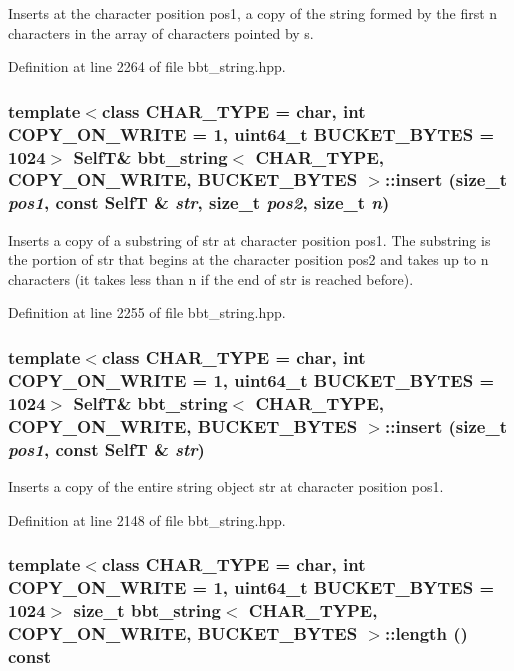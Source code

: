 Inserts at the character position pos1, a copy of the string formed by the first n characters in the array of characters pointed by s. 

Definition at line 2264 of file bbt\_\-string.hpp.\hypertarget{classbbt__string_fe7cd0b9d0f147a22424695cca30e463}{
\subsubsection[{insert}]{\setlength{\rightskip}{0pt plus 5cm}template$<$class CHAR\_\-TYPE  = char, int COPY\_\-ON\_\-WRITE = 1, uint64\_\-t BUCKET\_\-BYTES = 1024$>$ {\bf SelfT}\& {\bf bbt\_\-string}$<$ CHAR\_\-TYPE, COPY\_\-ON\_\-WRITE, BUCKET\_\-BYTES $>$::insert (size\_\-t {\em pos1}, \/  const {\bf SelfT} \& {\em str}, \/  size\_\-t {\em pos2}, \/  size\_\-t {\em n})}}
\label{classbbt__string_fe7cd0b9d0f147a22424695cca30e463}


Inserts a copy of a substring of str at character position pos1. The substring is the portion of str that begins at the character position pos2 and takes up to n characters (it takes less than n if the end of str is reached before). 

Definition at line 2255 of file bbt\_\-string.hpp.\hypertarget{classbbt__string_259cc9a9e878740d80a1be9d770c8106}{
\subsubsection[{insert}]{\setlength{\rightskip}{0pt plus 5cm}template$<$class CHAR\_\-TYPE  = char, int COPY\_\-ON\_\-WRITE = 1, uint64\_\-t BUCKET\_\-BYTES = 1024$>$ {\bf SelfT}\& {\bf bbt\_\-string}$<$ CHAR\_\-TYPE, COPY\_\-ON\_\-WRITE, BUCKET\_\-BYTES $>$::insert (size\_\-t {\em pos1}, \/  const {\bf SelfT} \& {\em str})}}
\label{classbbt__string_259cc9a9e878740d80a1be9d770c8106}


Inserts a copy of the entire string object str at character position pos1. 

Definition at line 2148 of file bbt\_\-string.hpp.\hypertarget{classbbt__string_09ba144b09ca3da53d028a4fd4209c1d}{
\subsubsection[{length}]{\setlength{\rightskip}{0pt plus 5cm}template$<$class CHAR\_\-TYPE  = char, int COPY\_\-ON\_\-WRITE = 1, uint64\_\-t BUCKET\_\-BYTES = 1024$>$ size\_\-t {\bf bbt\_\-string}$<$ CHAR\_\-TYPE, COPY\_\-ON\_\-WRITE, BUCKET\_\-BYTES $>$::length () const}}
\label{classbbt__string_09ba144b09ca3da53d028a4fd4209c1d}


